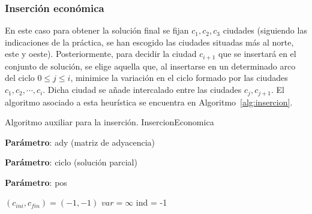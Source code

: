 \subsubsection{Inserción económica}

En este caso para obtener la solución final se fijan $c_1,c_2,c_3$ ciudades
(siguiendo las indicaciones de la práctica, se han
escogido las ciudades situadas más al norte, este y oeste). 
Posteriormente,
para decidir la ciudad $c_{i+1}$ que se insertará en el conjunto de solución,
se elige aquella que, al insertarse en un determinado arco del ciclo 
$0 \leq j \leq i$, minimice la variación en el ciclo formado por las ciudades
$c_1,c_2,\cdots,c_{i}$. Dicha ciudad se añade intercalado entre las ciudades
$c_{j},c_{j+1}$. El algoritmo asociado a esta heurística se encuentra en 
Algoritmo~\ref{alg:insercion}. 

\begin{algorithm}[H]
  \caption{Algoritmo auxiliar para la inserción. InsercionEconomica}\label{alg:insercion-aux-1}
  \begin{minipage}{0.92\textwidth}
    \textbf{Parámetro}: ady (matriz de adyacencia)

    \textbf{Parámetro}: ciclo (solución parcial)

    \textbf{Parámetro}: pos
  \end{minipage}

  $(c_{ini}, c_{fin}) = (-1,-1)$\;
  $var = \infty$\;
  ind = -1\;

  
\end{algorithm}

